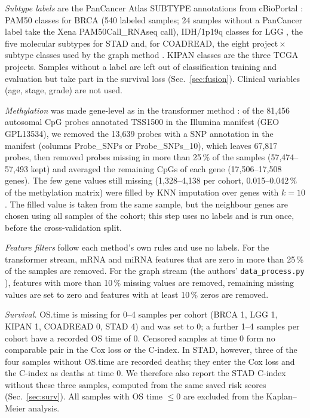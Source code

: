 \documentclass[conference]{IEEEtran}
\begin{document}
\emph{Subtype labels} are the PanCancer Atlas SUBTYPE annotations from cBioPortal
\cite{cerami2012cbioportal,gao2013cbioportal,hoadley2018pancan}: PAM50 classes for BRCA \cite{parker2009pam50}
(540 labeled samples; 24 samples without a PanCancer label take the Xena PAM50Call\_RNAseq call), IDH/1p19q classes for
LGG \cite{tcga2015lgg}, the five molecular subtypes for STAD \cite{tcga2014stad} and, for COADREAD, the eight
project\,$\times$\,subtype classes used by the graph method \cite{dou2025mogcan,tcga2012crc}. KIPAN classes are the three TCGA
projects. Samples without a label are left out of classification training and evaluation but take part in the
survival loss (Sec.~\ref{sec:fusion}). Clinical variables (age, stage, grade) are not used.

\emph{Methylation} was made gene-level as in the transformer method \cite{meng2026motcs}: of the 81,456 autosomal CpG probes
annotated TSS1500 in the Illumina manifest (GEO GPL13534), we removed the 13,639 probes with a SNP annotation in the
manifest (columns Probe\_SNPs or Probe\_SNPs\_10), which leaves 67,817 probes, then removed probes missing in more than 25\,\% of the samples (57,474--57,493 kept) and
averaged the remaining CpGs of each gene (17,506--17,508 genes). The few gene values still missing (1,328--4,138 per
cohort, 0.015--0.042\,\% of the methylation matrix) were filled by KNN imputation over genes with $k=10$
\cite{troyanskaya2001knn}. The filled value is taken from the same sample, but the neighbour genes are chosen using all
samples of the cohort; this step uses no labels and is run once, before the cross-validation split.

\emph{Feature filters} follow each method's own rules and use no labels. For the transformer stream, mRNA and miRNA
features that are zero in more than 25\,\% of the samples are removed. For the graph stream (the authors'
\texttt{data\_process.py} \cite{dou2025mogcan}), features with more than 10\,\% missing values are removed, remaining missing values are set to
zero and features with at least 10\,\% zeros are removed.

\emph{Survival.} OS.time is missing for 0--4 samples per cohort (BRCA 1, LGG 1, KIPAN 1, COADREAD 0, STAD 4) and was set
to 0; a further 1--4 samples per cohort have a recorded OS time of 0. Censored samples at time 0 form no comparable pair
in the Cox loss or the C-index. In STAD, however, three of the four samples without OS.time are recorded deaths; they
enter the Cox loss and the C-index as deaths at time 0. We therefore also report the STAD C-index without these three
samples, computed from the same saved risk scores (Sec.~\ref{sec:surv}). All samples
with OS time $\le 0$ are excluded from the Kaplan--Meier analysis.
\end{document}
